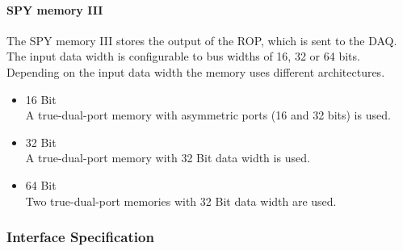 \paragraph{SPY memory III}
The SPY memory III stores the output of the ROP, which is sent to the DAQ. The input data width is configurable to bus widths of 16, 32 or 64 bits.
Depending on the input data width the memory uses different architectures.
\begin{itemize} 
\item 16 Bit \\
A true-dual-port memory with asymmetric ports (16 and 32 bits) is used. 
\item 32 Bit \\
A true-dual-port memory with 32 Bit data width is used.
\item 64 Bit \\
Two true-dual-port memories with 32 Bit data width are used.
\end{itemize}

% 
\subsubsection{Interface Specification}

\begin{minipage}{\textwidth}

\end{minipage}

